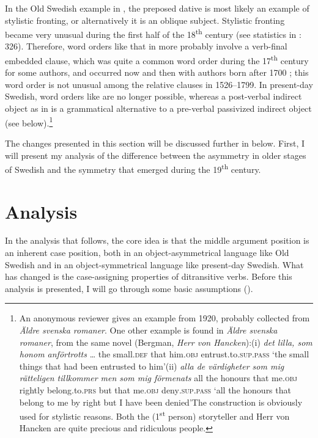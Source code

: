\documentclass[output=paper]{langscibook}
\begin{document}
In the Old Swedish example in , the preposed dative is most likely an example of stylistic fronting, or alternatively it is an oblique subject. Stylistic fronting became very unusual during the first half of the 18\textsuperscript{th} century (see statistics in \citealt{Falk1993}: 326). Therefore, word orders like that in  more probably involve a verb-final embedded clause, which was quite a common word order during the 17\textsuperscript{th} century for some authors, and occurred now and then with authors born after 1700 \citep{Platzack1983}; this word order is not unusual among the relative clauses in 1526–1799. In present-day Swedish, word orders like  are no longer possible, whereas a post-verbal indirect object as in  is a grammatical alternative to a pre-verbal passivized indirect object (see  below).\footnote{An anonymous reviewer gives an example from 1920, probably collected from \textit{Äldre svenska romaner}. One other example is found in \textit{Äldre svenska romaner}, from the same novel (Bergman, \textit{Herr von Hancken}):(i)  \textit{det  lilla,    som  honom    anförtrotts} …   the  small.\textsc{def}  that  him.\textsc{obj}  entrust.to.\textsc{sup.pass}  ‘the small things that had been entrusted to him’(ii)  \textit{alla de  värdigheter  som  mig    rätteligen  tillkommer    men  som  mig    förmenats}  all the  honours    that  me.\textsc{obj}  rightly    belong.to.\textsc{prs}  but  that  me.\textsc{obj}  deny\textsc{.sup.pass}  ‘all the honours that belong to me by right but I have been denied’The construction is obviously used for stylistic reasons. Both the (1\textsuperscript{st} person) storyteller and Herr von Hancken are quite precious and ridiculous people.}


The changes presented in this section will be discussed further in  below. First, I will present my analysis of the difference between the asymmetry in older stages of Swedish and the symmetry that emerged during the 19\textsuperscript{th} century.

\section{Analysis}\label{sec:falk:4}


In the analysis that follows, the core idea is that the middle argument position is an inherent case position, both in an object-asymmetrical language like Old Swedish and in an object-symmetrical language like present-day Swedish. What has changed is the case-assigning properties of ditransitive verbs. Before this analysis is presented, I will go through some basic assumptions ().
\end{document}
